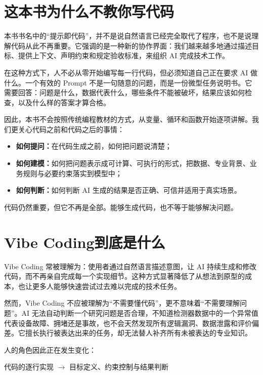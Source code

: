 \section*{这本书为什么不教你写代码}

本书书名中的“提示即代码”，并不是说自然语言已经完全取代了程序，也不是说理解代码从此不再重要。它强调的是一种新的协作界面：我们越来越多地通过描述目标、提供上下文、声明约束和规定验收标准，来组织 AI 完成技术工作。

在这种方式下，人不必从零开始编写每一行代码，但必须知道自己正在要求 AI 做什么。一个有效的 Prompt 不是一句随意的问题，而是一份微型任务说明书。它需要回答：问题是什么，数据代表什么，哪些条件不能被破坏，结果应该如何检查，以及什么样的答案才算合格。

因此，本书不会按照传统编程教材的方式，从变量、循环和函数开始逐项讲解。我们更关心代码之前和代码之后的事情：

\begin{itemize}
  \item \textbf{如何提问：}在代码生成之前，如何把问题说清楚；
  \item \textbf{如何建模：}如何把问题表示成可计算、可执行的形式，把数据、专业背景、业务规则与必要约束落实到模型中；
  \item \textbf{如何判断：}如何判断 AI 生成的结果是否正确、可信并适用于真实场景。
\end{itemize}

代码仍然重要，但它不再是全部。能够生成代码，也不等于能够解决问题。

\section*{Vibe Coding到底是什么}

Vibe Coding 常被理解为：使用者通过自然语言描述意图，让 AI 持续生成和修改代码，而不再亲自完成每一个实现细节。这种方式显著降低了从想法到原型的成本，也让更多人能够快速尝试过去难以完成的技术任务。

然而，Vibe Coding 不应被理解为“不需要懂代码”，更不意味着“不需要理解问题”。AI 无法自动判断一个研究问题是否合理，不知道检测器数据中的一个异常值代表设备故障、拥堵还是事故，也不会天然发现所有逻辑漏洞、数据泄露和评价偏差。它擅长执行被表达出来的任务，却无法替人补齐所有未被表达的专业知识。

人的角色因此正在发生变化：

\begin{center}
代码的逐行实现
$\longrightarrow$
目标定义、约束控制与结果判断
\end{center}

